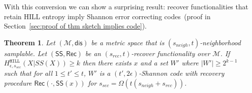 \documentclass[11pt]{article}
\newcommand{\secref}[1]{\mbox{Section~\ref{#1}}}
\newcommand{\thref}[1]{\mbox{Theorem~\ref{#1}}}
\newcommand{\class}[1]{{\ensuremath{\mathsf{#1}}}}
\newcommand{\sketch}{\ensuremath{\class{SS}}\xspace}
\newcommand{\rec}{\ensuremath{\class{Rec}}\xspace}
\newcommand{\sample}{\ensuremath{\class{Sample}}\xspace}
\newcommand{\dis}{\ensuremath{\mathsf{dis}}}
\newcommand{\hill}{\ensuremath{\mathtt{HILL}}\xspace}
\newcommand{\ngl}{\ensuremath{\mathtt{ngl}}\xspace}
\newcommand{\Hoo}{\mathrm{H}_\infty}
\newtheorem{theorem}{Theorem}[section]
\newcommand{\authnote}[2]{{\textcolor{red}{\textsf{#1 notes: }\textcolor{blue}{ #2}}\marginpar{\textcolor{red}{\textbf{!!!!!}}}}}
\newcommand{\authnote}[2]{}
\newcommand{\bnote}[1]{{\authnote{Ben}{#1}}}
\begin{document}
With this conversion we can show a surprising result: recover functionalities that retain HILL entropy imply Shannon error correcting codes~(proof in \secref{sec:proof of thm sketch implies code}).
\begin{theorem}\label{thm:impSketchArbitraryW}
Let $(\mathcal{M}, \dis)$ be a metric space that is $(s_{neigh}, t)$-neighborhood samplable.  Let $(\sketch, \rec)$ be an $(s_{rec}, t)$-recover functionality over $\mathcal{M}$.  If $H^{\hill}_{\epsilon, s_{sec}}(X|SS(X))\geq k$ then there exists $x$ and a set $W'$ where $|W'|\geq 2^{k-1}$ such that for all $1\leq t'\leq t$, $W'$ is a $(t', 2\epsilon)$-Shannon code with recovery procedure $\rec(\cdot, \sketch(x))$ for $s_{sec}= \Omega(t(s_{neigh}+s_{rec}))$.
\end{theorem}
\end{document}
